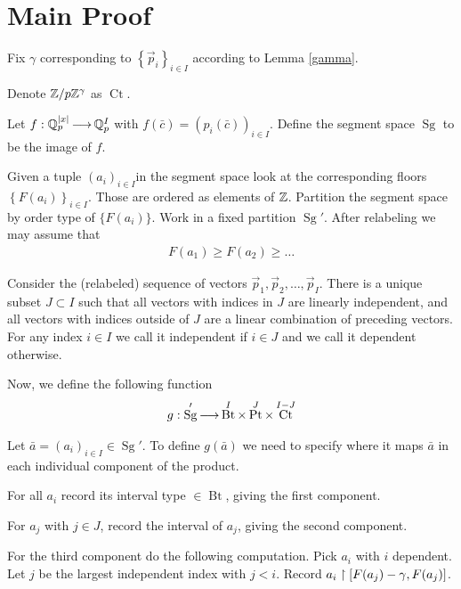 \documentclass{amsart}
\newcommand{\curly}[1]{\left\{#1\right\}}
\DeclareMathOperator{\Sg}{Sg}
\DeclareMathOperator{\Bt}{Bt}
\DeclareMathOperator{\Pt}{Pt}
\DeclareMathOperator{\Ct}{Ct}
\begin{document}

\section{Main Proof}

Fix $\gamma$ corresponding to $\curly{\vec p_i}_{i \in I}$ according to Lemma \ref{gamma}.

\begin{Definition}
	Denote $\mathbb{Z}/p\mathbb{Z}^\gamma$ as $\Ct$.
\end{Definition}

\begin{Definition}
	Let $f: \mathbb{Q}_p^{|x|} \operatorname{\longrightarrow} \mathbb{Q}_p^I$ with $f(\bar c) = (p_i(\bar c))_{i \in I}$.
	Define the segment space $\Sg$ to be the image of $f$.	
\end{Definition}


Given a tuple $(a_i)_{i\in I}$in the segment space look at the corresponding floors $\curly{F(a_i)}_{i\in I}$.
Those are ordered as elements of $\mathbb{Z}$.
Partition the segment space by order type of $\{F(a_i)\}$.
Work in a fixed partition $\Sg'$.
After relabeling we may assume that
\begin{align*}
	F(a_1) \geq F(a_2) \geq \ldots 
\end{align*}

Consider the (relabeled) sequence of vectors $\vec p_1, \vec p_2, \ldots, \vec p_I$.
There is a unique subset $J \subset I$ such that all vectors with indices in $J$ are linearly independent, and all vectors with indices outside of $J$ are a linear combination of preceding vectors.
For any index $i \in I$ we call it independent if $i \in J$ and we call it dependent otherwise.

Now, we define the following function
\begin{align*}
	g: \Sg' \arr \Bt^I \times \Pt^J \times \Ct^{I - J}
\end{align*}

Let $\bar a = (a_i)_{i\in I} \in \Sg'$.
To define $g(\bar a)$ we need to specify where it maps $\bar a$ in each individual component of the product.

For all $a_i$ record its interval type $\in \Bt$, giving the first component.

For $a_j$ with $j \in J$, record the interval of $a_j$, giving the second component.

For the third component do the following computation.
Pick $a_i$ with $i$ dependent.
Let $j$ be the largest independent index with $j < i$.
Record $a_i \upharpoonright [F(a_j) - \gamma, F(a_j)]$.
\end{document}
